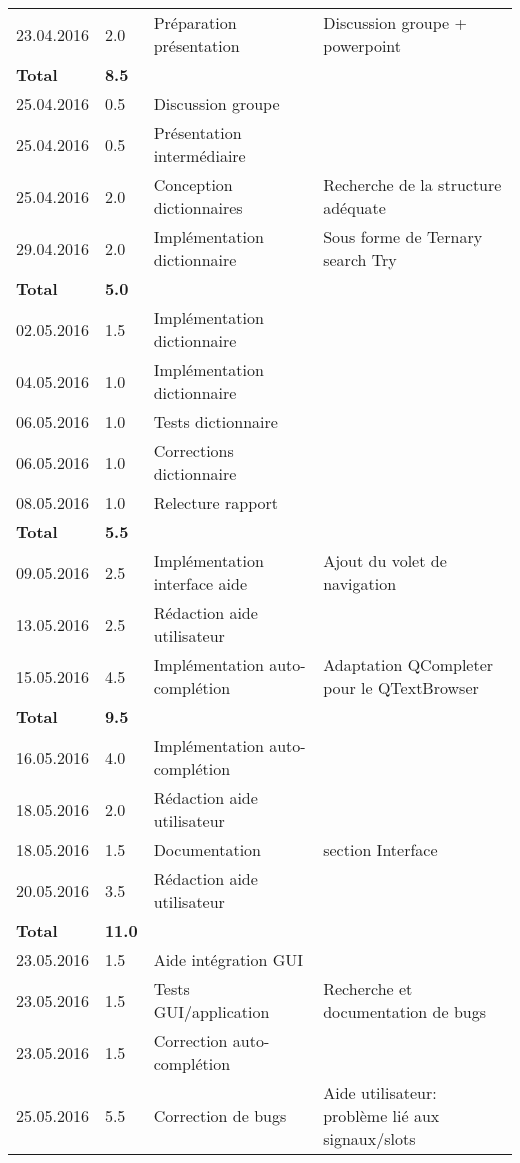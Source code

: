 \documentclass[french]{article}
\begin{document}
\begin{longtable}{p{}|p{}|p{}|p{}}
		23.04.2016 & 2.0 & Préparation présentation & Discussion groupe + powerpoint\\
		\textbf{Total} & \textbf{8.5} &&\\
		\hline
		25.04.2016 & 0.5 & Discussion groupe & \\
		25.04.2016 & 0.5 & Présentation intermédiaire & \\
		25.04.2016 & 2.0 & Conception dictionnaires & Recherche de la structure adéquate\\
		29.04.2016 & 2.0 & Implémentation dictionnaire & Sous forme de Ternary search Try\\
		\textbf{Total} & \textbf{5.0} &&\\
		\hline
		02.05.2016 & 1.5 & Implémentation dictionnaire & \\
		04.05.2016 & 1.0 & Implémentation dictionnaire & \\
		06.05.2016 & 1.0 & Tests dictionnaire & \\
		06.05.2016 & 1.0 & Corrections dictionnaire & \\
		08.05.2016 & 1.0 & Relecture rapport & \\
		\textbf{Total} & \textbf{5.5} &&\\
		\hline
		09.05.2016 & 2.5 & Implémentation interface aide & Ajout du volet de navigation \\
		13.05.2016 & 2.5 & Rédaction aide utilisateur & \\
		15.05.2016 & 4.5 & Implémentation auto-complétion & Adaptation QCompleter pour le QTextBrowser\\
		\textbf{Total} & \textbf{9.5} &&\\
		\hline
		16.05.2016 & 4.0 & Implémentation auto-complétion & \\
		18.05.2016 & 2.0 & Rédaction aide utilisateur & \\
		18.05.2016 & 1.5 & Documentation & section Interface\\
		20.05.2016 & 3.5 & Rédaction aide utilisateur & \\
		\textbf{Total} & \textbf{11.0} &&\\
		\hline
		23.05.2016 & 1.5 & Aide intégration GUI & \\
		23.05.2016 & 1.5 & Tests GUI/application & Recherche et documentation de bugs\\
		23.05.2016 & 1.5 & Correction auto-complétion & \\
		25.05.2016 & 5.5 & Correction de bugs & Aide utilisateur: problème lié aux signaux/slots\\

\end{longtable}
\end{document}
